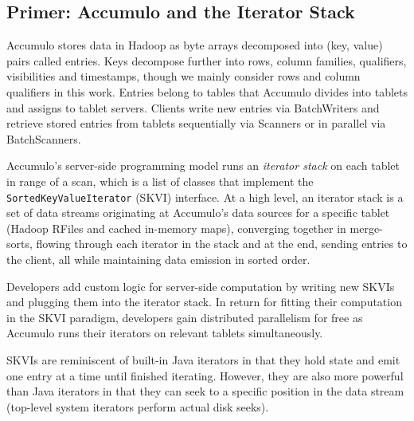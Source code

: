 





\subsection{Primer: Accumulo and the Iterator Stack}
\label{sAccumuloIterators}
Accumulo stores data in Hadoop as byte arrays decomposed into (key, value) pairs called entries.
Keys decompose further into rows, column families, qualifiers, visibilities and timestamps,
though we mainly consider rows and column qualifiers in this work.
Entries belong to tables that Accumulo divides into tablets and assigns to tablet servers.
Clients write new entries via BatchWriters and retrieve stored entries from tablets sequentially via Scanners
or in parallel via BatchScanners.

Accumulo's server-side programming model runs an \emph{iterator stack} on each tablet in range of a scan, 
which is a list of classes that implement the \texttt{SortedKeyValueIterator} (SKVI) interface.
At a high level, an iterator stack is a set of data streams originating
at Accumulo's data sources for a specific tablet (Hadoop RFiles and cached in-memory maps), 
converging together in merge-sorts,
flowing through each iterator in the stack and at the end, sending entries to the client,
all while maintaining data emission in sorted order.

Developers add custom logic for server-side computation
by writing new SKVIs and plugging them into the iterator stack.
In return for fitting their computation in the SKVI paradigm, developers gain
distributed parallelism for free as Accumulo runs their iterators on relevant tablets simultaneously.


SKVIs are reminiscent of built-in Java iterators in that they hold state 
and emit one entry at a time until finished iterating.
However, they are also more powerful than Java iterators in that they can seek to a specific position
in the data stream (top-level system iterators perform actual disk seeks).

